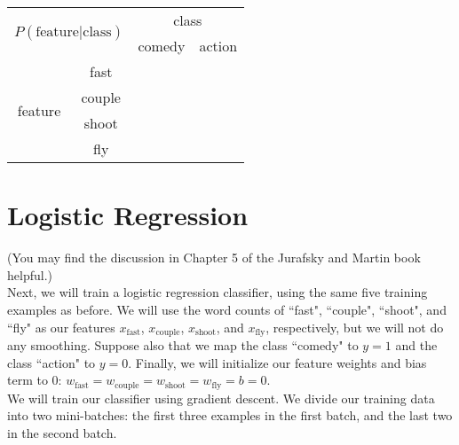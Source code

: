 \documentclass[11pt,letterpaper]{article}
\begin{document}
\begin{center}
\begin{tabular}{|c|c|c|c|}
\hline 
\multicolumn{2}{|c|}{\multirow{2}{*}{$P(\mathrm{feature|class})$}} & \multicolumn{2}{|c|}{class} \\ 
\cline{3-4}
\multicolumn{2}{|c|}{} & comedy & action \\ 
\hline 
\multirow{4}{*}{feature} & fast &  &  \\ 
\cline{2-4}
& couple &  &  \\ 
\cline{2-4}
& shoot &  &  \\ 
\cline{2-4}
& fly &  &  \\ 
\hline
\end{tabular} 
\end{center}

\section{Logistic Regression}

(You may find the discussion in Chapter 5 of the Jurafsky and Martin book helpful.)\\

\noindent Next, we will train a logistic regression classifier, using the same five training examples as before. We will use the word counts of ``fast", ``couple", ``shoot", and ``fly" as our features $x_\mathrm{fast}$, $x_\mathrm{couple}$, $x_\mathrm{shoot}$, and $x_\mathrm{fly}$, respectively, but we will not do any smoothing. Suppose also that we map the class ``comedy" to $y=1$ and the class ``action" to $y=0$. Finally, we will initialize our feature weights and bias term to 0: $w_\mathrm{fast}=w_\mathrm{couple}=w_\mathrm{shoot}=w_\mathrm{fly}=b=0$.\\

\noindent We will train our classifier using gradient descent. We divide our training data into two mini-batches: the first three examples in the first batch, and the last two in the second batch.
\end{document}
